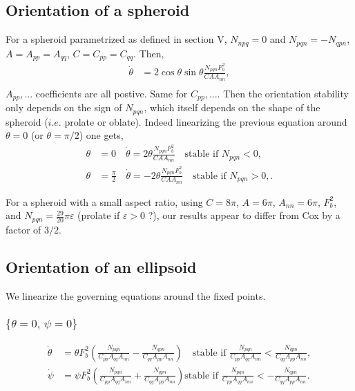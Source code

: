 \documentclass[12pt]{My_preprint}
\begin{document}
\subsection{Orientation of a spheroid}



For a spheroid parametrized as defined in section V,  $N_{npq} = 0$  and $N_{pqn} = - N_{qpn}$, $A = A_{pp} =A_{qq}$, $C = C_{pp} =C_{qq}$. 
Then, 
\begin{align}
    \dot \theta  &= 2\cos \theta \sin \theta \frac{N_{pqn}F_b^2}{CA A_{nn}}, \\
\end{align}
$A_{pp}, ...$ coefficients are all postive. Same for $C_{pp}, ...$. 
Then the orientation stability only depends on the sign of $N_{pqn}$, which itself depends on the shape of the spheroid ($i.e.$ prolate or oblate).
Indeed linearizing the previous equation around $\theta =0$ (or $\theta =\pi/2$) one gets,
\begin{align}
 \theta &= 0 \quad   \dot \theta  =  2\theta \frac{N_{pqn}F_b^2}{CA A_{nn}} \quad \text{stable if $N_{pqn}< 0$}, \\
 \theta &= \frac{\pi}{2} \quad   \dot \theta  =  -2\theta \frac{N_{pqn}F_b^2}{CA A_{nn}} \quad \text{stable if $N_{pqn}> 0$},.
\end{align}

For a spheroid with a small aspect ratio, using $C = 8\pi$, $A = 6\pi$, $A_{nn} = 6\pi$, $F_b^2$, and $N_{pqn} = \frac{29}{20}\pi \varepsilon$ (prolate if $\varepsilon >0$ ?), our results appear to differ from Cox by a factor of $3/2$.


\subsection{Orientation of an ellipsoid}
We linearize the governing equations around the fixed points.
 
\subsubsection{$\{\theta = 0, \, \psi = 0\}$}
\begin{align}
    \dot \theta  &=  \theta F_b^2 \left(\frac{N_{pqn}}{C_{pp}A_{qq} A_{nn}} - \frac{N_{qpn}}{C_{qq}A_{pp} A_{nn}}\right) \quad \text{stable if $\frac{N_{pqn}}{C_{pp}A_{qq} A_{nn}}$} <\frac{N_{qpn}}{C_{qq}A_{pp} A_{nn}}, \\
    \dot \psi   &=  \psi F_b^2 \left(\frac{N_{pqn}}{C_{pp}A_{qq} A_{nn}}+\frac{N_{qpn}}{C_{qq}A_{pp} A_{nn}}\right)\text{stable if $\frac{N_{pqn}}{C_{pp}A_{qq} A_{nn}}  < -\frac{N_{qpn}}{C_{qq}A_{pp} A_{nn}}$}.
\end{align}
\end{document}
